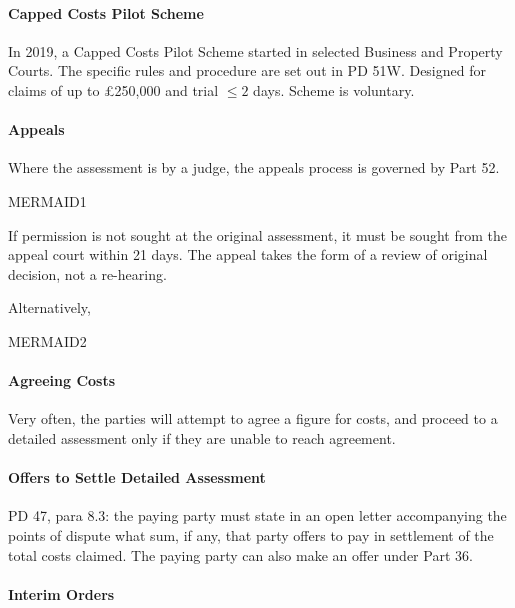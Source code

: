 \documentclass[
]{article}
\begin{document}
\hypertarget{capped-costs-pilot-scheme}{%
\paragraph{Capped Costs Pilot Scheme}\label{capped-costs-pilot-scheme}}

In 2019, a Capped Costs Pilot Scheme started in selected Business and
Property Courts. The specific rules and procedure are set out in PD 51W.
Designed for claims of up to £250,000 and trial \(\leq 2\) days. Scheme
is voluntary.

\hypertarget{appeals}{%
\paragraph{Appeals}\label{appeals}}

Where the assessment is by a judge, the appeals process is governed by
Part 52.

MERMAID1

If permission is not sought at the original assessment, it must be
sought from the appeal court within 21 days. The appeal takes the form
of a review of original decision, not a re-hearing.

Alternatively,

MERMAID2

\hypertarget{agreeing-costs}{%
\paragraph{Agreeing Costs}\label{agreeing-costs}}

Very often, the parties will attempt to agree a figure for costs, and
proceed to a detailed assessment only if they are unable to reach
agreement.

\hypertarget{offers-to-settle-detailed-assessment}{%
\paragraph{Offers to Settle Detailed
Assessment}\label{offers-to-settle-detailed-assessment}}

PD 47, para 8.3: the paying party must state in an open letter
accompanying the points of dispute what sum, if any, that party offers
to pay in settlement of the total costs claimed. The paying party can
also make an offer under Part 36.

\hypertarget{interim-orders}{%
\paragraph{Interim Orders}\label{interim-orders}}
\end{document}

